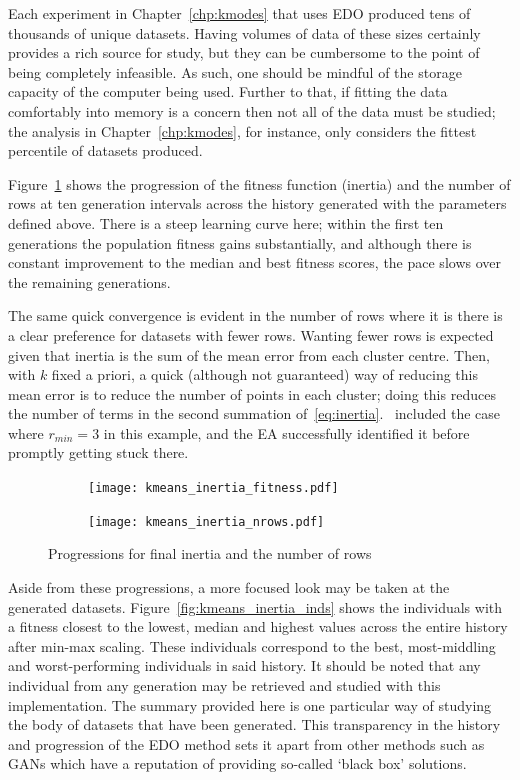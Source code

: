 Each experiment in Chapter~\ref{chp:kmodes} that uses EDO produced tens of
thousands of unique datasets. Having volumes of data of these sizes certainly
provides a rich source for study, but they can be cumbersome to the point of
being completely infeasible. As such, one should be mindful of the storage
capacity of the computer being used. Further to that, if fitting the data
comfortably into memory is a concern then not all of the data must be studied;
the analysis in Chapter~\ref{chp:kmodes}, for instance, only considers the
fittest percentile of datasets produced.

Figure~\ref{fig:inertia_progression} shows the progression of the fitness
function (inertia) and the number of rows at ten generation intervals across the
history generated with the parameters defined above. There is a steep learning
curve here; within the first ten generations the population fitness gains
substantially, and although there is constant improvement to the median and best
fitness scores, the pace slows over the remaining generations.

The same quick convergence is evident in the number of rows where it is there is
a clear preference for datasets with fewer rows. Wanting fewer rows is
expected given that inertia is the sum of the mean error from each cluster
centre. Then, with \(k\) fixed a priori, a quick (although not guaranteed) way
of reducing this mean error is to reduce the number of points in each cluster;
doing this reduces the number of terms in the second summation
of~\eqref{eq:inertia}.~\cite{Wilde2020:edo} included the case where
\(r_{min}=3\) in this example, and the EA successfully identified it before
promptly getting stuck there.

\begin{figure}
    \centering
    \begin{subfigure}{\imgwidth}
        \texttt{[image: kmeans\_inertia\_fitness.pdf]}%
    \end{subfigure}

    \begin{subfigure}{\imgwidth}
        \texttt{[image: kmeans\_inertia\_nrows.pdf]}%
    \end{subfigure}
    \caption{%
        Progressions for final inertia and the number of rows
    }\label{fig:inertia_progression}
\end{figure}

Aside from these progressions, a more focused look may be taken at the generated
datasets. Figure~\ref{fig:kmeans_inertia_inds} shows the individuals with a
fitness closest to the lowest, median and highest values across the entire
history after min-max scaling. These individuals correspond to the best,
most-middling and worst-performing individuals in said history. It should be
noted that any individual from any generation may be retrieved and studied with
this implementation. The summary provided here is one particular way of studying
the body of datasets that have been generated. This transparency in the history
and progression of the EDO method sets it apart from other methods such as GANs
which have a reputation of providing so-called `black box' solutions.

